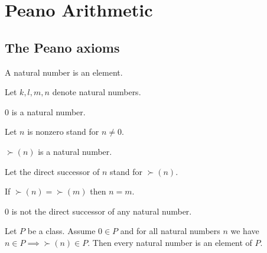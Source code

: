 \documentclass[../../natural-numbers.ftl.tex]{subfiles}
\begin{document}

  \section{Peano Arithmetic}

  \subsection{The Peano axioms}

  \begin{forthel}
    \begin{signature}
      A natural number is an element.
    \end{signature}

    Let $k,l,m,n$ denote natural numbers.

    \begin{signature}
      $0$ is a natural number.
    \end{signature}

    Let $n$ is nonzero stand for $n \neq 0$.

    \begin{signature}
      $\succ(n)$ is a natural number.
    \end{signature}

    Let the direct successor of $n$ stand for $\succ(n)$.

    \begin{axiom}
      If $\succ(n) = \succ(m)$ then $n = m$.
    \end{axiom}

    \begin{axiom}
      $0$ is not the direct successor of any natural number.
    \end{axiom}

    \begin{axiom}
      Let $P$ be a class.
      Assume $0 \in P$ and for all natural numbers $n$ we have $n \in P \implies \succ(n) \in P$.
      Then every natural number is an element of $P$.
    \end{axiom}
  \end{forthel}
\end{document}
